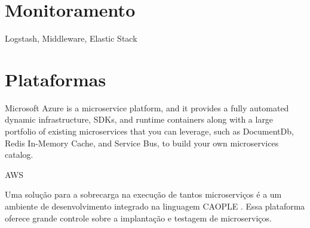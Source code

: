 





\section{Monitoramento}

Logstash, Middleware, Elastic Stack

\section{Plataformas}

Microsoft Azure is a microservice platform, and it provides a fully automated dynamic infrastructure, SDKs, and runtime containers along with a large portfolio of existing microservices that you can leverage, such as DocumentDb, Redis In-Memory Cache, and Service Bus, to build your own microservices catalog. \cite{Familiar2015}

AWS

Uma solução para a sobrecarga na execução de tantos microserviços é a um ambiente de desenvolvimento integrado na linguagem CAOPLE \cite{CAOPLE}. Essa plataforma oferece grande controle sobre a implantação e testagem de microserviços.